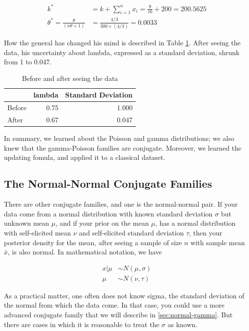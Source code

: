 \documentclass[]{book}
\theoremstyle{definition}
\theoremstyle{definition}
\theoremstyle{definition}
\theoremstyle{remark}
\begin{document}
\[\begin{aligned}
k^* &= k + \sum^n_{i=1} x_i = \frac{9}{16} + 200 = 200.5625 \\
\theta^* = \frac{\theta}{(n\theta+1)} &= \frac{4/3}{300\times(4/3)} = 0.0033
\end{aligned}\]

How the general has changed his mind is described in Table
\ref{tab:before-after}. After seeing the data, his uncertainty about
lambda, expressed as a standard deviation, shrunk from 1 to 0.047.

\begin{table}

\caption{\label{tab:before-after}Before and after seeing the data}
\centering
\begin{tabular}[t]{lrr}
\toprule
  & lambda & Standard Deviation\\
\midrule
Before & 0.75 & 1.000\\
After & 0.67 & 0.047\\
\bottomrule
\end{tabular}
\end{table}

In summary, we learned about the Poisson and gamma distributions; we
also knew that the gamma-Poisson families are conjugate. Moreover, we
learned the updating fomula, and applied it to a classical dataset.

\subsection{The Normal-Normal Conjugate
Families}\label{sec:normal-normal}

There are other conjugate families, and one is the normal-normal pair.
If your data come from a normal distribution with known standard
deviation \(\sigma\) but unknown mean \(\mu\), and if your prior on the
mean \(\mu\), has a normal distribution with self-elicited mean \(\nu\)
and self-elicited standard deviation \(\tau\), then your posterior
density for the mean, after seeing a sample of size \(n\) with sample
mean \(\bar{x}\), is also normal. In mathematical notation, we have

\[\begin{aligned}
x|\mu &\sim N(\mu,\sigma) \\
\mu &\sim N(\nu, \tau)
\end{aligned}\]

As a practical matter, one often does not know sigma, the standard
deviation of the normal from which the data come. In that case, you
could use a more advanced conjugate family that we will describe in
\ref{sec:normal-gamma}. But there are cases in which it is reasonable to
treat the \(\sigma\) as known.
\end{document}
